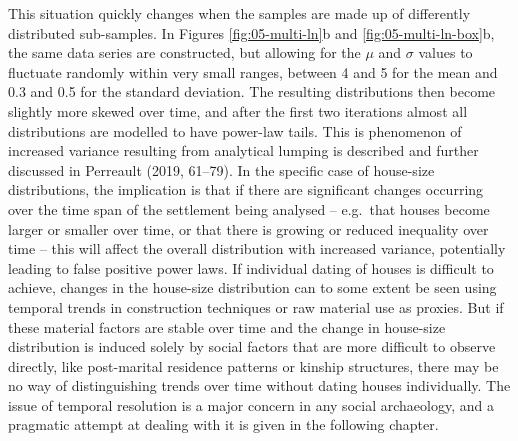 \documentclass[
  12pt,
  a4paper, twoside]{book}
\begin{document}
This situation quickly changes when the samples are made up of differently distributed sub-samples. In Figures \ref{fig:05-multi-ln}b and \ref{fig:05-multi-ln-box}b, the same data series are constructed, but allowing for the \(\mu\) and \(\sigma\) values to fluctuate randomly within very small ranges, between 4 and 5 for the mean and 0.3 and 0.5 for the standard deviation. The resulting distributions then become slightly more skewed over time, and after the first two iterations almost all distributions are modelled to have power-law tails. This is phenomenon of increased variance resulting from analytical lumping is described and further discussed in Perreault (2019, 61--79). In the specific case of house-size distributions, the implication is that if there are significant changes occurring over the time span of the settlement being analysed -- e.g.~that houses become larger or smaller over time, or that there is growing or reduced inequality over time -- this will affect the overall distribution with increased variance, potentially leading to false positive power laws. If individual dating of houses is difficult to achieve, changes in the house-size distribution can to some extent be seen using temporal trends in construction techniques or raw material use as proxies. But if these material factors are stable over time and the change in house-size distribution is induced solely by social factors that are more difficult to observe directly, like post-marital residence patterns or kinship structures, there may be no way of distinguishing trends over time without dating houses individually. The issue of temporal resolution is a major concern in any social archaeology, and a pragmatic attempt at dealing with it is given in the following chapter.
\end{document}
